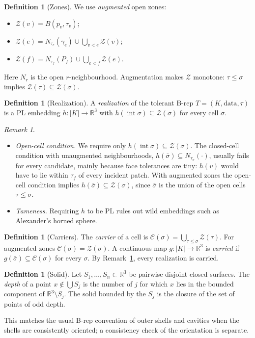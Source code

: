 \documentclass[preprint,12pt]{elsarticle}
\theoremstyle{definition}
\newtheorem{definition}[theorem]{Definition}
\theoremstyle{remark}
\newtheorem{remark}[theorem]{Remark}
\newcommand{\R}{\mathbb{R}}
\newcommand{\Z}{\mathcal{Z}}
\newcommand{\C}{\mathcal{C}}
\newcommand{\inter}{\operatorname{int}}
\begin{document}
\begin{definition}[Zones]\label{def:zones}
We use \emph{augmented} open zones:
\begin{itemize}
\item $\Z(v)=B(p_v,\tau_v)$;
\item $\Z(e)=N_{\tau_e}(\gamma_e)\cup\bigcup_{v<e}\Z(v)$;
\item $\Z(f)=N_{\tau_f}(P_f)\cup\bigcup_{e<f}\Z(e)$.
\end{itemize}
Here $N_r$ is the open $r$-neighbourhood. Augmentation makes $\Z$ monotone: $\tau\le\sigma$ implies
$\Z(\tau)\subseteq\Z(\sigma)$.
\end{definition}

\begin{definition}[Realization]\label{def:realization}
A \emph{realization} of the tolerant B-rep $T=(K,\text{data},\tau)$ is a PL embedding $h\colon|K|\to\R^3$ with
$h(\inter\sigma)\subseteq\Z(\sigma)$ for every cell $\sigma$.
\end{definition}

\begin{remark}\label{rem:opencell}
\begin{itemize}
\item \emph{Open-cell condition.} We require only $h(\inter\sigma)\subseteq\Z(\sigma)$. The closed-cell
condition with unaugmented neighbourhoods, $h(\bar\sigma)\subseteq N_{\tau_\sigma}(\cdot)$, usually fails for every
candidate, mainly because face tolerances are tiny: $h(v)$ would have to lie within $\tau_f$ of every incident patch. With augmented zones the open-cell
condition implies $h(\bar\sigma)\subseteq\Z(\sigma)$, since $\bar\sigma$ is the union of the open cells
$\tau\le\sigma$.
\item \emph{Tameness.} Requiring $h$ to be PL rules out wild embeddings such as Alexander's horned sphere.
\end{itemize}
\end{remark}

\begin{definition}[Carriers]
The \emph{carrier} of a cell is $\C(\sigma)=\bigcup_{\tau\le\sigma}\Z(\tau)$. For augmented zones
$\C(\sigma)=\Z(\sigma)$. A continuous map $g\colon|K|\to\R^3$ is \emph{carried} if $g(\bar\sigma)\subseteq
\C(\sigma)$ for every $\sigma$. By Remark~\ref{rem:opencell}, every realization is carried.
\end{definition}

\begin{definition}[Solid]\label{def:solid}
Let $S_1,\dots,S_n\subset\R^3$ be pairwise disjoint closed surfaces. The \emph{depth} of a point $x\notin\bigcup S_j$
is the number of $j$ for which $x$ lies in the bounded component of $\R^3\setminus S_j$. The solid bounded by
the $S_j$ is the closure of the set of points of odd depth.
\end{definition}
This matches the usual B-rep convention of outer shells and cavities when the shells are consistently oriented;
a consistency check of the orientation is separate.
\end{document}
